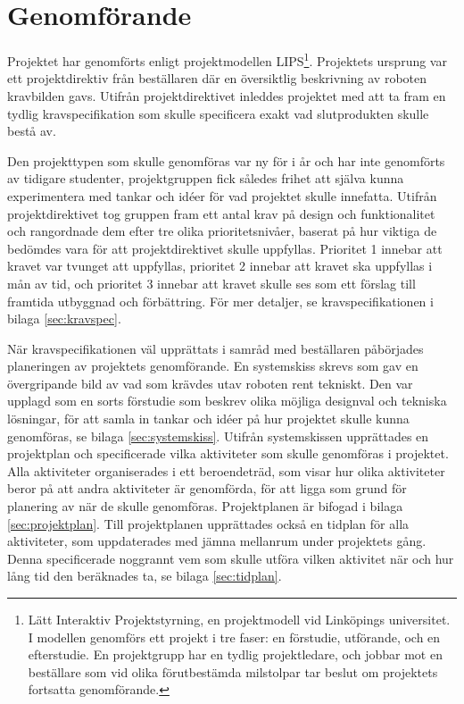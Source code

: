 

\section{Genomförande}
\label{sec:utforande}
Projektet har genomförts enligt projektmodellen LIPS\footnote{Lätt Interaktiv Projektstyrning, en projektmodell vid Linköpings universitet. I modellen genomförs ett projekt i tre faser: en förstudie, utförande, och en efterstudie. En projektgrupp har en tydlig projektledare, och jobbar mot en beställare som vid olika förutbestämda milstolpar tar beslut om projektets fortsatta genomförande.}. Projektets ursprung var ett projektdirektiv från beställaren där en översiktlig beskrivning av roboten  kravbilden gavs. Utifrån projektdirektivet inleddes projektet med att ta fram en tydlig kravspecifikation som skulle specificera exakt vad slutprodukten skulle bestå av.

Den projekttypen som skulle genomföras var ny för i år och har inte genomförts av tidigare studenter, projektgruppen fick således frihet att själva kunna experimentera med tankar och idéer för vad projektet skulle innefatta. Utifrån projektdirektivet tog gruppen fram ett antal krav på design och funktionalitet och rangordnade dem efter tre olika prioritetsnivåer, baserat på hur viktiga de bedömdes vara för att projektdirektivet skulle uppfyllas. Prioritet 1 innebar att kravet var tvunget att uppfyllas, prioritet 2 innebar att kravet ska uppfyllas i mån av tid, och prioritet 3 innebar att kravet skulle ses som ett förslag till framtida utbyggnad och förbättring. För mer detaljer, se kravspecifikationen i bilaga \ref{sec:kravspec}.

När kravspecifikationen väl upprättats i samråd med beställaren påbörjades planeringen av projektets genomförande. En systemskiss skrevs som gav en övergripande bild av vad som krävdes utav roboten rent tekniskt. Den var upplagd som en sorts förstudie som beskrev olika möjliga designval och tekniska lösningar, för att samla in tankar och idéer på hur projektet skulle kunna genomföras, se bilaga \ref{sec:systemskiss}. Utifrån systemskissen upprättades en projektplan och specificerade vilka aktiviteter som skulle genomföras i projektet. Alla aktiviteter organiserades i ett beroendeträd, som visar hur olika aktiviteter beror på att andra aktiviteter är genomförda, för att ligga som grund för planering av när de skulle genomföras. Projektplanen är bifogad i bilaga \ref{sec:projektplan}. Till projektplanen upprättades också en tidplan för alla aktiviteter, som uppdaterades med jämna mellanrum under projektets gång. Denna specificerade noggrannt vem som skulle utföra vilken aktivitet när och hur lång tid den beräknades ta, se bilaga \ref{sec:tidplan}.

